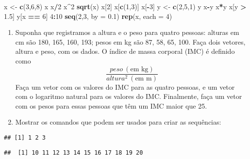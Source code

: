 \documentclass[
]{article}
\newenvironment{Shaded}{\begin{snugshade}}{\end{snugshade}}
\newcommand{\AttributeTok}[1]{\textcolor[rgb]{0.13,0.29,0.53}{#1}}
\newcommand{\DecValTok}[1]{\textcolor[rgb]{0.00,0.00,0.81}{#1}}
\newcommand{\FloatTok}[1]{\textcolor[rgb]{0.00,0.00,0.81}{#1}}
\newcommand{\FunctionTok}[1]{\textcolor[rgb]{0.13,0.29,0.53}{\textbf{#1}}}
\newcommand{\NormalTok}[1]{#1}
\newcommand{\OtherTok}[1]{\textcolor[rgb]{0.56,0.35,0.01}{#1}}
\newcommand{\SpecialCharTok}[1]{\textcolor[rgb]{0.81,0.36,0.00}{\textbf{#1}}}
\begin{document}
\begin{Shaded}
\begin{Highlighting}[]
\NormalTok{  x }\OtherTok{\textless{}{-}} \FunctionTok{c}\NormalTok{(}\DecValTok{3}\NormalTok{,}\DecValTok{6}\NormalTok{,}\DecValTok{8}\NormalTok{)}
\NormalTok{  x}
\NormalTok{  x}\SpecialCharTok{/}\DecValTok{2}
\NormalTok{  x}\SpecialCharTok{\^{}}\DecValTok{2}
  \FunctionTok{sqrt}\NormalTok{(x)}
\NormalTok{  x[}\DecValTok{2}\NormalTok{]}
\NormalTok{  x[}\FunctionTok{c}\NormalTok{(}\DecValTok{1}\NormalTok{,}\DecValTok{3}\NormalTok{)]}
\NormalTok{  x[}\SpecialCharTok{{-}}\DecValTok{3}\NormalTok{]}
\NormalTok{  y }\OtherTok{\textless{}{-}} \FunctionTok{c}\NormalTok{(}\DecValTok{2}\NormalTok{,}\DecValTok{5}\NormalTok{,}\DecValTok{1}\NormalTok{)}
\NormalTok{  y}
\NormalTok{  x}\SpecialCharTok{{-}}\NormalTok{y}
\NormalTok{  x}\SpecialCharTok{*}\NormalTok{y}
\NormalTok{  x[y }\SpecialCharTok{\textgreater{}} \FloatTok{1.5}\NormalTok{]}
\NormalTok{  y[x }\SpecialCharTok{==} \DecValTok{6}\NormalTok{]}
  \DecValTok{4}\SpecialCharTok{:}\DecValTok{10}
  \FunctionTok{seq}\NormalTok{(}\DecValTok{2}\NormalTok{,}\DecValTok{3}\NormalTok{, }\AttributeTok{by =} \FloatTok{0.1}\NormalTok{)}
  \FunctionTok{rep}\NormalTok{(x, }\AttributeTok{each =} \DecValTok{4}\NormalTok{)}
\end{Highlighting}
\end{Shaded}

\begin{enumerate}
\def\labelenumi{\arabic{enumi}.}
\setcounter{enumi}{7}
\item
  Suponha que registramos a altura e o peso para quatro pessoas: alturas
  em cm são 180, 165, 160, 193; pesos em kg são 87, 58, 65, 100. Faça
  dois vetores, altura e peso, com os dados. O índice de massa corporal
  (IMC) é definido como \[
   \frac{peso \ (\text{em kg})}{altura^2 \ (\text{em m}) }
  \] Faça um vetor com os valores do IMC para as quatro pessoas, e um
  vetor com o logaritmo natural para os valores do IMC. Finalmente, faça
  um vetor com os pesos para essas pessoas que têm um IMC maior que 25.
\item
  Mostrar os comandos que podem ser usados para criar as sequências:
\end{enumerate}

\begin{verbatim}
## [1] 1 2 3
\end{verbatim}

\begin{verbatim}
##  [1] 10 11 12 13 14 15 16 17 18 19 20
\end{verbatim}
\end{document}
